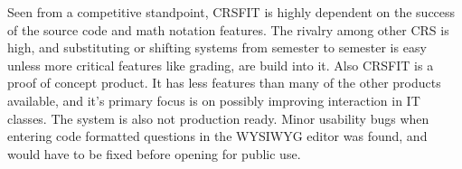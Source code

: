 Seen from a competitive standpoint, CRSFIT is highly dependent on the success of the source code and math notation features. The rivalry among other CRS is high, and substituting or shifting systems from semester to semester is easy unless more critical features like grading, are build into it. Also CRSFIT is a proof of concept product. It has less features than many of the other products available, and it's primary focus is on possibly improving interaction in IT classes. The system is also not production ready. Minor usability bugs when entering code formatted questions in the WYSIWYG editor was found, and would have to be fixed before opening for public use. 





%    
%
        